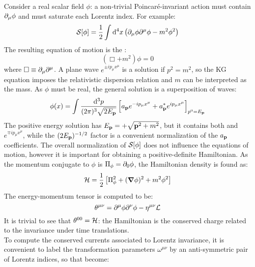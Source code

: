 Consider a real scalar field $ \phi $: a non-trivial Poincaré-invariant action must contain $ \partial_\mu \phi $ and must saturate each Lorentz index. For example:
\begin{equation}
  \mathcal{S}[\phi] = \frac{1}{2} \int \mathrm{d}^4 x \left( \partial_\mu \phi \partial^\mu \phi - m^2 \phi^2 \right)
\end{equation}
The resulting equation of motion is the :
\begin{equation}
  \left( \Box + m^2 \right) \phi = 0
\end{equation}
where $ \Box \equiv \partial_\mu \partial^\mu $. A plane wave $ e^{\pm i p_\mu x^\mu} $ is a solution if $ p^2 = m^2 $, so the KG equation imposes the relativistic dispersion relation and $ m $ can be interpreted as the mass. As $ \phi $ must be real, the general solution is a superposition of waves:
\begin{equation}
  \phi(x) = \int \frac{\mathrm{d}^3 p}{(2\pi)^3 \sqrt{2E_{\mathbf{p}}}} \left[ a_{\mathbf{p}} e^{-i p_\mu x^\mu} + a^*_{\mathbf{p}} e^{i p_\mu x^\mu} \right]_{p^0 = E_{\mathbf{p}}}
  \label{eq:scalar-field-exp}
\end{equation}
The positive energy solution has $ E_{\mathbf{p}} = + \sqrt{\mathbf{p}^2 + m^2} $, but it contains both  and  $ e^{\mp i p_\mu x^\mu} $, while the $ (2E_{\mathbf{p}})^{-1/2} $ factor is a convenient normalization of the $ a_{\mathbf{p}} $ coefficients. The overall normalization of $ \mathcal{S}[\phi] $ does not influence the equations of motion, however it is important for obtaining a positive-definite Hamiltonian. As the momentum conjugate to $ \phi $ is $ \Pi_\phi = \partial_0 \phi $, the Hamiltonian density is found as:
\begin{equation}
  \mathcal{H} = \frac{1}{2} \left[ \Pi_\phi^2 + (\boldsymbol{\nabla} \phi)^2 + m^2 \phi^2 \right]
  \label{eq:scalar-field-haml}
\end{equation}
The energy-momentum tensor is computed to be:
\begin{equation}
  \theta^{\mu \nu} = \partial^\mu \phi \partial^\nu \phi - \eta^{\mu \nu} \mathcal{L}
  \label{eq:scalar-field-en-mom-tens}
\end{equation}
It is trivial to see that $ \theta^{00} = \mathcal{H} $: the Hamiltonian is the conserved charge related to the invariance under time translations.\\
To compute the conserved currents associated to Lorentz invariance, it is convenient to label the transformation parameters $ \omega^{\mu \nu} $ by an anti-symmetric pair of Lorentz indices, so that  become:
